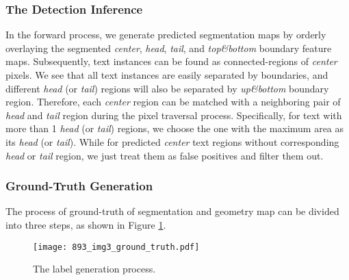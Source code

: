 \documentclass[letterpaper]{article} \usepackage{aaai20}  \usepackage{times}  \usepackage{helvet} \usepackage{courier}  \usepackage[hyphens]{url}  \usepackage{graphicx} \urlstyle{rm} \def\UrlFont{\rm}  \usepackage{graphicx}  \frenchspacing  \setlength{\pdfpagewidth}{8.5in}  \setlength{\pdfpageheight}{11in}  \usepackage{amsmath}
\begin{document}
\subsubsection{The Detection Inference}
In the forward process, we generate predicted segmentation maps by orderly overlaying the segmented \emph{center}, \emph{head}, \emph{tail}, and \emph{top\&bottom} boundary feature maps.
Subsequently, text instances can be found as connected-regions of \emph{center} pixels.
We see that all text instances are easily separated by boundaries, and different \emph{head} (or \emph{tail}) regions will also be separated by \emph{up\&bottom} boundary region. Therefore, each \emph{center} region can be matched with a neighboring pair of \emph{head} and \emph{tail} region during the pixel traversal process.
Specifically, for text with more than 1 \emph{head} (or \emph{tail}) regions, we choose the one with the maximum area as its \emph{head} (or \emph{tail}).
While for predicted \emph{center} text regions without corresponding \emph{head} or \emph{tail} region, we just treat them as false positives and filter them out.

\subsubsection{Ground-Truth Generation}
The process of ground-truth of segmentation and geometry map can be divided into three steps, as shown in Figure \ref{labelgeneration}.
\begin{figure}
\centering
\texttt{[image: 893\_img3\_ground\_truth.pdf]}\\
\caption{The label generation process.}
\label{labelgeneration}
\end{figure}
\end{document}
